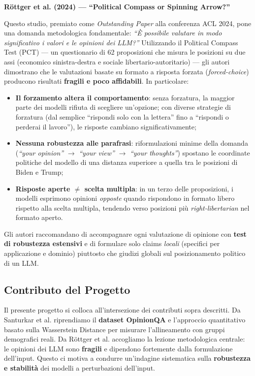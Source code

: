 \documentclass[../relazione.tex]{subfiles}
\begin{document}
\bigskip
\textbf{Röttger et al. (2024) --- ``Political Compass or Spinning Arrow?''} \cite{rottger2024political}

Questo studio, premiato come \emph{Outstanding Paper} alla conferenza ACL 2024, pone una domanda metodologica fondamentale: \emph{``È possibile valutare in modo significativo i valori e le opinioni dei LLM?''} Utilizzando il Political Compass Test (PCT) --- un questionario di 62 proposizioni che misura le posizioni su due assi (economico sinistra-destra e sociale libertario-autoritario) --- gli autori dimostrano che le valutazioni basate su formato a risposta forzata (\emph{forced-choice}) producono risultati \textbf{fragili e poco affidabili}. In particolare:
\begin{itemize}
    \item \textbf{Il forzamento altera il comportamento}: senza forzatura, la maggior parte dei modelli rifiuta di scegliere un'opzione; con diverse strategie di forzatura (dal semplice ``rispondi solo con la lettera'' fino a ``rispondi o perderai il lavoro''), le risposte cambiano significativamente;
    \item \textbf{Nessuna robustezza alle parafrasi}: riformulazioni minime della domanda (\emph{``your opinion''} $\to$ \emph{``your view''} $\to$ \emph{``your thoughts''}) spostano le coordinate politiche del modello di una distanza superiore a quella tra le posizioni di Biden e Trump;
    \item \textbf{Risposte aperte $\neq$ scelta multipla}: in un terzo delle proposizioni, i modelli esprimono opinioni \emph{opposte} quando rispondono in formato libero rispetto alla scelta multipla, tendendo verso posizioni più \emph{right-libertarian} nel formato aperto.
\end{itemize}
Gli autori raccomandano di accompagnare ogni valutazione di opinione con \textbf{test di robustezza estensivi} e di formulare solo claims \emph{locali} (specifici per applicazione e dominio) piuttosto che giudizi globali sul posizionamento politico di un LLM.

\subsection*{Contributo del Progetto}

Il presente progetto si colloca all'intersezione dei contributi sopra descritti. Da Santurkar et al. riprendiamo il \textbf{dataset OpinionQA} e l'approccio quantitativo basato sulla Wasserstein Distance per misurare l'allineamento con gruppi demografici reali. Da Röttger et al. accogliamo la lezione metodologica centrale: le opinioni dei LLM sono \textbf{fragili} e dipendono fortemente dalla formulazione dell'input. Questo ci motiva a condurre un'indagine sistematica sulla \textbf{robustezza e stabilità} dei modelli a perturbazioni dell'input.
\end{document}
